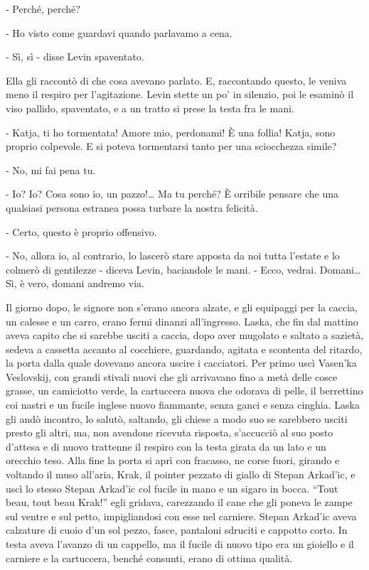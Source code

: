 - Perché, perché? 

- Ho visto come guardavi quando parlavamo a cena. 

- Sì, sì - disse Levin spaventato. 

Ella gli raccontò di che cosa avevano parlato. E, raccontando questo, le veniva meno il respiro per l'agitazione. Levin stette un po' in silenzio, poi le esaminò il viso pallido, spaventato, e a un tratto si prese la testa fra le mani. 

- Katja, ti ho tormentata! Amore mio, perdonami! È una follia! Katja, sono proprio colpevole. E si poteva tormentarsi tanto per una sciocchezza simile? 

- No, mi fai pena tu. 

- Io? Io? Cosa sono io, un pazzo!\ldots{} Ma tu perché? È orribile pensare che una qualsiasi persona estranea possa turbare la nostra felicità. 

- Certo, questo è proprio offensivo. 

- No, allora io, al contrario, lo lascerò stare apposta da noi tutta l'estate e lo colmerò di gentilezze - diceva Levin, baciandole le mani. - Ecco, vedrai. Domani\ldots{} Sì, è vero, domani andremo via. 

\label{viii-5} 

Il giorno dopo, le signore non s'erano ancora alzate, e gli equipaggi per la caccia, un calesse e un carro, erano fermi dinanzi all'ingresso. Laska, che fin dal mattino aveva capito che si sarebbe usciti a caccia, dopo aver mugolato e saltato a sazietà, sedeva a cassetta accanto al cocchiere, guardando, agitata e scontenta del ritardo, la porta dalla quale dovevano ancora uscire i cacciatori. Per primo uscì Vasen'ka Veslovskij, con grandi stivali nuovi che gli arrivavano fino a metà delle cosce grasse, un camiciotto verde, la cartuccera nuova che odorava di pelle, il berrettino coi nastri e un fucile inglese nuovo fiammante, senza ganci e senza cinghia. Laska gli andò incontro, lo salutò, saltando, gli chiese a modo suo se sarebbero usciti presto gli altri, ma, non avendone ricevuta risposta, s'accucciò al suo posto d'attesa e di nuovo trattenne il respiro con la testa girata da un lato e un orecchio teso. Alla fine la porta si aprì con fracasso, ne corse fuori, girando e voltando il muso all'aria, Krak, il pointer pezzato di giallo di Stepan Arkad'ic, e uscì lo stesso Stepan Arkad'ic col fucile in mano e un sigaro in bocca. ``Tout beau, tout beau Krak!'' egli gridava, carezzando il cane che gli poneva le zampe sul ventre e sul petto, impigliandosi con esse nel carniere. Stepan Arkad'ic aveva calzature di cuoio d'un sol pezzo, fasce, pantaloni sdruciti e cappotto corto. In testa aveva l'avanzo di un cappello, ma il fucile di nuovo tipo era un gioiello e il carniere e la cartuccera, benché consunti, erano di ottima qualità. 

